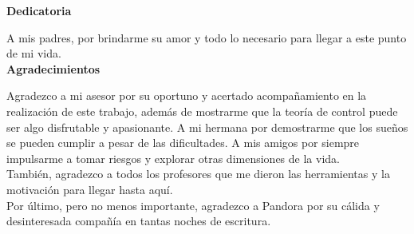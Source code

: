 \newpage
    \thispagestyle{empty}
    


\begin{center}
    \textbf{Dedicatoria}%


    
   	A mis padres, por brindarme su amor y todo lo necesario para llegar a este punto de mi vida.\\[2cm]	
   	
    
    \textbf{Agradecimientos}%
    
    Agradezco a mi asesor por su oportuno y acertado acompañamiento en la realización de este trabajo, además de mostrarme que la teoría de control puede ser algo disfrutable y apasionante. A mi hermana por demostrarme que los sueños se pueden cumplir a pesar de las dificultades. A mis amigos por siempre impulsarme a tomar riesgos y explorar otras dimensiones de la vida.\\
      
    También, agradezco a todos los profesores que me dieron las herramientas y la motivación para llegar hasta aquí.\\[1cm]
    Por último, pero no menos importante, agradezco a Pandora por su cálida y desinteresada compañía en tantas noches de escritura.   
\end{center} 




\newpage
\pagestyle{empty}
\renewcommand{\contentsname}{\centerline{\normalfont\normalsize TABLA DE CONTENIDO}}
    \tableofcontents 
    
    
    
\newpage
     \pagestyle{empty}
    \renewcommand{\listtablename}{\centerline{\normalfont\normalsize LISTA DE TABLAS}}
    \listoftables
    
